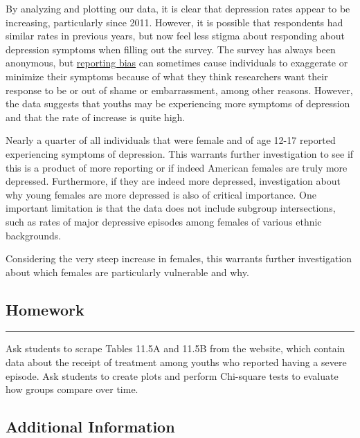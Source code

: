 \documentclass[
]{article}
\begin{document}
By analyzing and plotting our data, it is clear that depression rates
appear to be increasing, particularly since 2011. However, it is
possible that respondents had similar rates in previous years, but now
feel less stigma about responding about depression symptoms when filling
out the survey. The survey has always been anonymous, but
\href{https://en.wikipedia.org/wiki/Self-report_study\#:~:text=Self\%2Dreport\%20studies\%20are\%20inherently,answers\%20will\%20be\%20more\%20positive.}{reporting
bias} can sometimes cause individuals to exaggerate or minimize their
symptoms because of what they think researchers want their response to
be or out of shame or embarrassment, among other reasons. However, the
data suggests that youths may be experiencing more symptoms of
depression and that the rate of increase is quite high.

Nearly a quarter of all individuals that were female and of age 12-17
reported experiencing symptoms of depression. This warrants further
investigation to see if this is a product of more reporting or if indeed
American females are truly more depressed. Furthermore, if they are
indeed more depressed, investigation about why young females are more
depressed is also of critical importance. One important limitation is
that the data does not include subgroup intersections, such as rates of
major depressive episodes among females of various ethnic backgrounds.

Considering the very steep increase in females, this warrants further
investigation about which females are particularly vulnerable and why.

\hypertarget{homework}{%
\subsection{\texorpdfstring{\textbf{Homework}}{Homework}}\label{homework}}

\begin{center}\rule{0.5\linewidth}{0.5pt}\end{center}

Ask students to scrape Tables 11.5A and 11.5B from the website, which
contain data about the receipt of treatment among youths who reported
having a severe episode. Ask students to create plots and perform
Chi-square tests to evaluate how groups compare over time.

\hypertarget{additional-information}{%
\subsection{\texorpdfstring{\textbf{Additional
Information}}{Additional Information}}\label{additional-information}}
\end{document}
